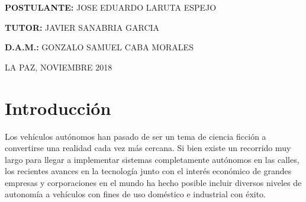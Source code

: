 \documentclass[12pt,letterpaper]{article}
\begin{document}
\begin{titlepage}
\begin{center}
\vspace*{0.2in}

\begin{large}
\textbf{POSTULANTE:} JOSE EDUARDO LARUTA ESPEJO\\
\end{large}

\begin{large}
\hspace{0.08in} \textbf{TUTOR:} JAVIER SANABRIA GARCIA\\
\end{large}

\begin{large}
\hspace{0.44in} \textbf{D.A.M.:} GONZALO SAMUEL CABA MORALES\\
\end{large}

\vspace*{0.2in}

\begin{normalsize}
LA PAZ, NOVIEMBRE 2018\\
\end{normalsize}
\end{center}
\end{titlepage}


\thispagestyle{empty}
\tableofcontents
\newpage



\section{Introducción}

Los vehículos autónomos han pasado de ser un tema de ciencia ficción a convertirse una realidad cada vez más 
cercana. Si bien existe un recorrido muy largo para llegar a implementar sistemas completamente autónomos en las calles, 
los recientes avances en la tecnología junto con el interés económico de grandes empresas y corporaciones en el mundo 
ha hecho posible incluir diversos niveles de autonomía a vehículos con fines de uso doméstico e industrial con éxito.
\end{document}
